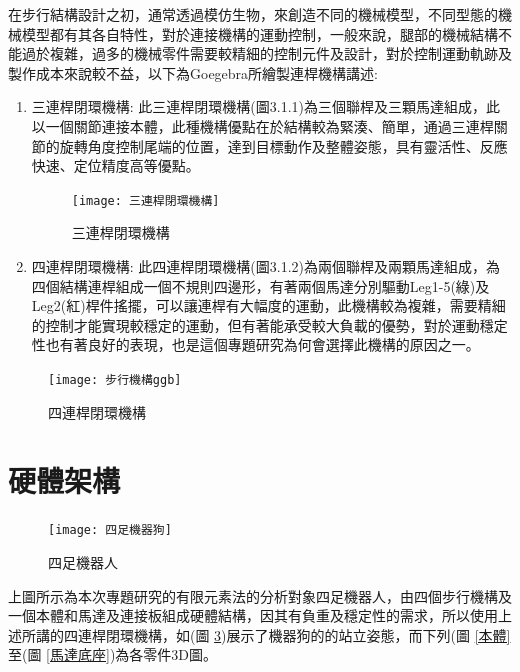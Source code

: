 在步行結構設計之初，通常透過模仿生物，來創造不同的機械模型，不同型態的機械模型都有其各自特性，對於連接機構的運動控制，一般來說，腿部的機械結構不能過於複雜，過多的機械零件需要較精細的控制元件及設計，對於控制運動軌跡及製作成本來說較不益，以下為Goegebra所繪製連桿機構講述:\
\begin{enumerate}
\item 三連桿閉環機構:
此三連桿閉環機構(圖3.1.1)為三個聯桿及三顆馬達組成，此以一個關節連接本體，此種機構優點在於結構較為緊湊、簡單，通過三連桿關節的旋轉角度控制尾端的位置，達到目標動作及整體姿態，具有靈活性、反應快速、定位精度高等優點。\

\begin{figure}[hbt!]
\begin{center}
\texttt{[image: 三連桿閉環機構]}
\caption{\Large 三連桿閉環機構}\label{三連桿閉環機構}
\end{center}
\end{figure}
\newpage

\item 四連桿閉環機構:
此四連桿閉環機構(圖3.1.2)為兩個聯桿及兩顆馬達組成，為四個結構連桿組成一個不規則四邊形，有著兩個馬達分別驅動Leg1-5(綠)及Leg2(紅)桿件搖擺，可以讓連桿有大幅度的運動，此機構較為複雜，需要精細的控制才能實現較穩定的運動，但有著能承受較大負載的優勢，對於運動穩定性也有著良好的表現，也是這個專題研究為何會選擇此機構的原因之一。
\end{enumerate}

\begin{figure}[hbt!]
\begin{center}
\texttt{[image: 步行機構ggb]}
\caption{\Large 四連桿閉環機構}\label{GeoGebra步行機構}
\end{center}
\end{figure}
\newpage

\section{硬體架構}

\begin{figure}[hbt!]
\begin{center}
\texttt{[image: 四足機器狗]}
\caption{\Large 四足機器人}\label{四足機器狗}
\end{center}
\end{figure}
上圖所示為本次專題研究的有限元素法的分析對象四足機器人，由四個步行機構及一個本體和馬達及連接板組成硬體結構，因其有負重及穩定性的需求，所以使用上述所講的四連桿閉環機構，如(圖 \ref{四足機器狗})展示了機器狗的的站立姿態，而下列(圖 \ref{本體}至(圖 \ref{馬達底座})為各零件3D圖。\
\newpage

